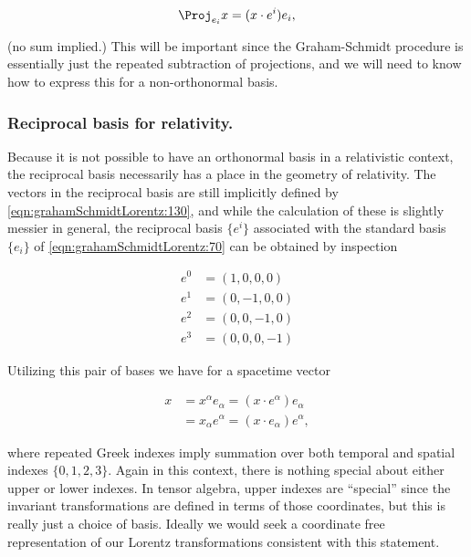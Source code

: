 \begin{equation}\label{eqn:grahamSchmidtLorentz:560}
\Proj_{e_i} x = (x \cdot e^i) e_i,
\end{equation}

(no sum implied.)  This will be important since the Graham-Schmidt procedure is essentially just the repeated subtraction of projections, and we will need to know how to express this for a non-orthonormal basis.

\subsubsection{Reciprocal basis for relativity.}

Because it is not possible to have an orthonormal basis in a relativistic context, the reciprocal basis necessarily has a place in the geometry of relativity.  The vectors in the reciprocal basis are still implicitly defined by \ref{eqn:grahamSchmidtLorentz:130}, and while the calculation of these is slightly messier in general, the reciprocal basis $\{e^i\}$ associated with the standard basis $\{e_i\}$ of \ref{eqn:grahamSchmidtLorentz:70} can be obtained by inspection

\begin{equation}\label{eqn:grahamSchmidtLorentz:70b}
\begin{aligned}
e^0 &= (1, 0, 0, 0) \\
e^1 &= (0, -1, 0, 0) \\
e^2 &= (0, 0, -1, 0) \\
e^3 &= (0, 0, 0, -1)
\end{aligned}
\end{equation}

Utilizing this pair of bases we have for a spacetime vector

\begin{equation}\label{eqn:grahamSchmidtLorentz:331}
\begin{aligned}
x &= x^\alpha e_\alpha = (x \cdot e^\alpha) e_\alpha \\
  &= x_\alpha e^\alpha = (x \cdot e_\alpha) e^\alpha,
\end{aligned}
\end{equation}

where repeated Greek indexes imply summation over both temporal and spatial indexes $\{0, 1, 2, 3\}$.  Again in this context, there is nothing special about either upper or lower indexes.  In tensor algebra, upper indexes are ``special'' since the invariant transformations are defined in terms of those coordinates, but this is really just a choice of basis.  Ideally we would seek a coordinate free representation of our Lorentz transformations consistent with this statement.


